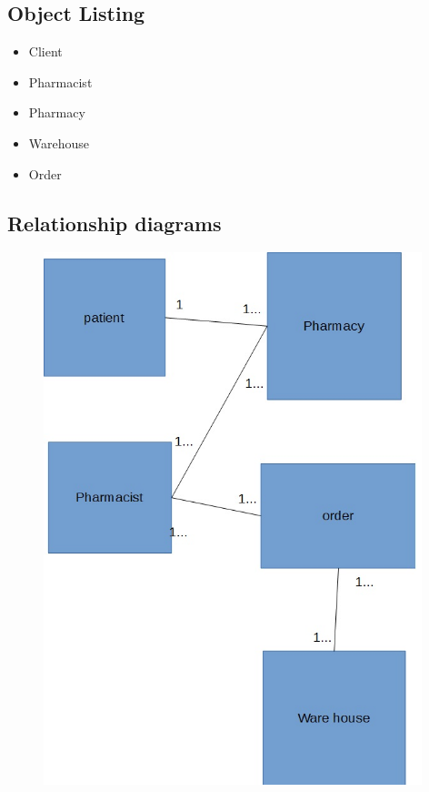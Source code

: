 \subsection{Object Listing}
\begin{itemize}

\item Client
\item Pharmacist
\item Pharmacy
\item Warehouse
\item Order

\end{itemize}
\subsection{Relationship diagrams}
\begin{figure}[ht!]
\centering
\includegraphics[width=110mm]{er diagram.JPG}
\end{figure}
